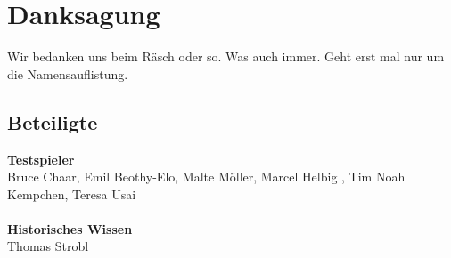 \chapter*{Danksagung}

Wir bedanken uns beim Räsch oder so. Was auch immer. Geht erst mal nur um die Namensauflistung.


\section*{Beteiligte}
\textbf{Testspieler} \\ 
Bruce Chaar, Emil Beothy-Elo, Malte Möller, Marcel Helbig , Tim Noah Kempchen, Teresa Usai\\ \\
\textbf{Historisches Wissen}\\
Thomas Strobl